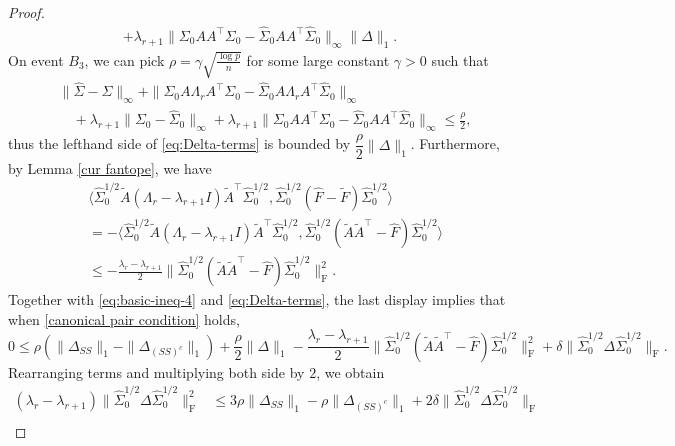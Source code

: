 \documentclass[11pt]{article}
\newcommand{\so}{\widehat{\Sigma}_0}
\newcommand{\0}{{\mathbf{0}}}
\newcommand{\tA}{{\widetilde{A}}}
\newcommand{\tF}{{\widetilde{F}}}
\begin{document}
\begin{proof}
\begin{equation}
\begin{aligned}
+\lambda_{r+1}\|\Sigma_0AA^\top\Sigma_0-\widehat{\Sigma}_0AA^\top\so\|_\infty\|\Delta\|_1.
\end{aligned}
\end{equation}
On event $B_3$, we can pick $\rho=\gamma\sqrt{\frac{\log p}{n}}$ for some large constant $\gamma > 0$ such that  
\begin{equation}
      \label{canonical pair condition}
\begin{aligned}
& \|\widehat{\Sigma}-\Sigma\|_\infty+\|\Sigma_0A\Lambda_rA^\top\Sigma_0-\so A\Lambda_r A^\top\so\|_\infty \\
& \quad
+\lambda_{r+1}\|\Sigma_0-\widehat{\Sigma}_0\|_\infty+\lambda_{r+1}\|\Sigma_0AA^\top\Sigma_0-\widehat{\Sigma}_0AA^\top\so\|_\infty\leq\frac{\rho}{2},
\end{aligned}
\end{equation}
thus the lefthand side of \eqref{eq:Delta-terms} is bounded by $\dfrac{\rho}{2}\|\Delta\|_1$. 
Furthermore, by Lemma \ref{cur fantope}, we have 
\begin{align*}
& \langle \so^{1/2}\tA(\Lambda_r-\lambda_{r+1}I) \tA^\top\so^{1/2},\so^{1/2}(\widehat{F}-\tF)\so^{1/2} \rangle
\\ 
& = -\langle \so^{1/2}\tA(\Lambda_r-\lambda_{r+1}I) \tA^\top\so^{1/2},\so^{1/2}(\tA\tA^\top-\widehat{F})\so^{1/2} \rangle\\
& \leq -\frac{\lambda_r-\lambda_{r+1}}{2}\|\so^{1/2}(\tA\tA^\top-\widehat{F})\so^{1/2} \|_\mathrm{F}^2.
\end{align*}
Together with \eqref{eq:basic-ineq-4} and \eqref{eq:Delta-terms}, the last display implies that when \eqref{canonical pair condition} holds,
\begin{equation*}
    0\leq \rho(\|\Delta_{SS}\|_1-\|\Delta_{(SS)^c}\|_1)+\frac{\rho}{2}\|\Delta\|_1-\frac{\lambda_r-\lambda_{r+1}}{2}\|\so^{1/2}(\tA\tA^\top-\widehat{F})\so^{1/2} \|_\mathrm{F}^2+\delta\|\so^{1/2}\Delta\so^{1/2}\|_\mathrm{F}.
\end{equation*}
Rearranging terms and multiplying both side by $2$, we obtain
\begin{align*}    (\lambda_r-\lambda_{r+1})\|\widehat{\Sigma}^{1/2}_0\Delta\widehat{\Sigma}^{1/2}_0\|_\mathrm{F}^2&\leq 3\rho\|\Delta_{SS}\|_1-\rho\|\Delta_{(SS)^c}\|_1+2\delta\|\widehat{\Sigma}^{1/2}_0\Delta\widehat{\Sigma}^{1/2}_0\|_\mathrm{F}\\

\end{align*}
\end{proof}
\end{document}
